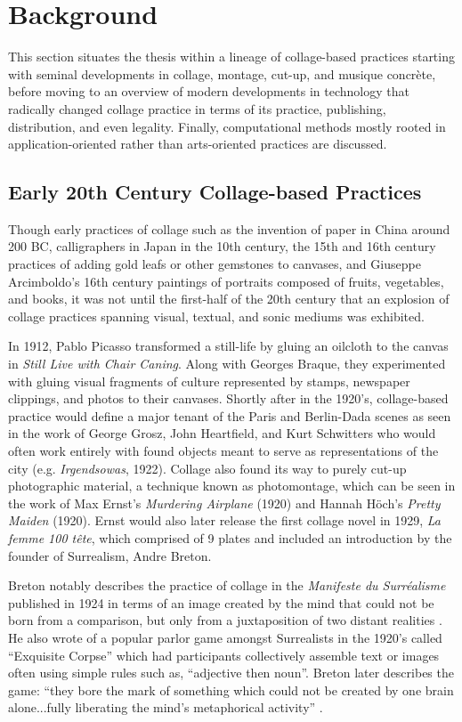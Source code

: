 \documentclass[a4paper,10pt,final]{ThesisStyle}
\begin{document}
\section{Background}

This section situates the thesis within a lineage of collage-based practices starting with seminal developments in collage, montage, cut-up, and musique concr\`ete, before moving to an overview of modern developments in technology that radically changed collage practice in terms of its practice, publishing, distribution, and even legality.  Finally, computational methods mostly rooted in application-oriented rather than arts-oriented practices are discussed.  

\subsection{Early 20th Century Collage-based Practices}
Though early practices of collage such as the invention of paper in China around 200 BC, calligraphers in Japan in the 10th century, the 15th and 16th century practices of adding gold leafs or other gemstones to canvases, and Giuseppe Arcimboldo's 16th century paintings of portraits composed of fruits, vegetables, and books, it was not until the first-half of the 20th century that an explosion of collage practices spanning visual, textual, and sonic mediums was exhibited.  

In 1912, Pablo Picasso transformed a still-life by gluing an oilcloth to the canvas in \textit{Still Live with Chair Caning}.  Along with Georges Braque, they experimented with gluing visual fragments of culture represented by stamps, newspaper clippings, and photos to their canvases.  Shortly after in the 1920's, collage-based practice would define a major tenant of the Paris and Berlin-Dada scenes as seen in the work of George Grosz, John Heartfield, and Kurt Schwitters who would often work entirely with found objects meant to serve as representations of the city (e.g. \textit{Irgendsowas}, 1922).  Collage also found its way to purely cut-up photographic material, a technique known as photomontage, which can be seen in the work of Max Ernst's \textit{Murdering Airplane} (1920) and Hannah H\"och's \textit{Pretty Maiden} (1920).  Ernst would also later release the first collage novel in 1929, \textit{La femme 100 t\^{e}te}, which comprised of 9 plates and included an introduction by the founder of Surrealism, Andre Breton.  

Breton notably describes the practice of collage in the \textit{Manifeste du Surr\'{e}alisme} published in 1924 in terms of an image created by the mind that could not be born from a comparison, but only from a juxtaposition of two distant realities \cite{Breton1924}.  He also wrote of a popular parlor game amongst Surrealists in the 1920's called ``Exquisite Corpse'' which had participants collectively assemble text or images often using simple rules such as, ``adjective then noun''.  Breton later describes the game: ``they bore the mark of something which could not be created by one brain alone...fully liberating the mind's metaphorical activity'' \cite{BretonRemembers}.    
\end{document}
